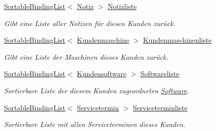 \begin{DoxyCompactItemize}
\hyperlink{class_products_1_1_common_1_1_sortable_binding_list}{Sortable\+Binding\+List}$<$ \hyperlink{class_products_1_1_model_1_1_entities_1_1_notiz}{Notiz} $>$ \hyperlink{class_products_1_1_model_1_1_entities_1_1_kunde_ae73fb69dec119766fc1db0177f1709f7}{Notizliste}
\begin{DoxyCompactList}\small\item\em Gibt eine Liste aller Notizen für diesen Kunden zurück. \end{DoxyCompactList}\item 
\hyperlink{class_products_1_1_common_1_1_sortable_binding_list}{Sortable\+Binding\+List}$<$ \hyperlink{class_products_1_1_model_1_1_entities_1_1_kundenmaschine}{Kundenmaschine} $>$ \hyperlink{class_products_1_1_model_1_1_entities_1_1_kunde_a17dd85fea2b3bd29483fcfa15a3cfccb}{Kundenmaschinenliste}
\begin{DoxyCompactList}\small\item\em Gibt eine Liste der Maschinen dieses Kunden zurück. \end{DoxyCompactList}\item 
\hyperlink{class_products_1_1_common_1_1_sortable_binding_list}{Sortable\+Binding\+List}$<$ \hyperlink{class_products_1_1_model_1_1_entities_1_1_kundensoftware}{Kundensoftware} $>$ \hyperlink{class_products_1_1_model_1_1_entities_1_1_kunde_ac3b0ecf32f4f852804361d5ce6bc47c7}{Softwareliste}
\begin{DoxyCompactList}\small\item\em Sortierbare Liste der diesem Kunden zugeordneten \hyperlink{class_products_1_1_model_1_1_entities_1_1_software}{Software}. \end{DoxyCompactList}\item 
\hyperlink{class_products_1_1_common_1_1_sortable_binding_list}{Sortable\+Binding\+List}$<$ \hyperlink{class_products_1_1_model_1_1_entities_1_1_servicetermin}{Servicetermin} $>$ \hyperlink{class_products_1_1_model_1_1_entities_1_1_kunde_aa0355e6fb3d7750ef96f95b4ebedcae7}{Serviceterminliste}
\begin{DoxyCompactList}\small\item\em Sortierbare Liste mit allen Serviceterminen dieses Kunden. \end{DoxyCompactList}\item 

\end{DoxyCompactItemize}
